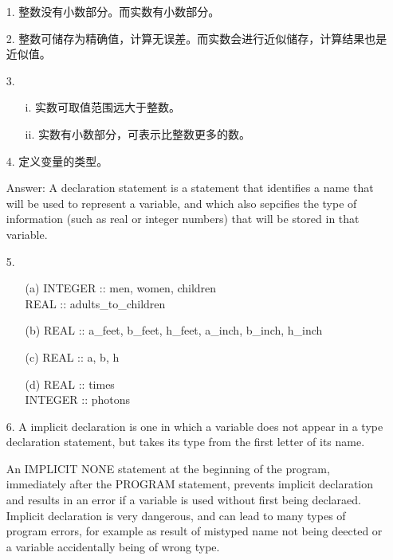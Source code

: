 \documentclass[a4paper,titlepage]{report}
\theoremstyle{definition}
\begin{document}
\begin{itemize}
  \item[1.]
  整数没有小数部分。而实数有小数部分。

  \item[2.]
  整数可储存为精确值，计算无误差。而实数会进行近似储存，计算结果也是近似值。

  \item[3.]
  \begin{itemize}
    \item[i.]
    实数可取值范围远大于整数。

    \item[ii.]
    实数有小数部分，可表示比整数更多的数。

  \end{itemize}

  \item[4.]
  定义变量的类型。 \par
  Answer: A declaration statement is a statement that identifies a name that will be used to represent a variable, and which also sepcifies the type of information (such as real or integer numbers) that will be stored in that variable.

  \item[5.]
  \begin{itemize}
    \item[(a)]
    INTEGER :: men, women, children \\
    REAL :: adults\_to\_children

    \item[(b)]
    REAL :: a\_feet, b\_feet, h\_feet, a\_inch, b\_inch, h\_inch

    \item[(c)]
    REAL :: a, b, h

    \item[(d)]
    REAL :: times \\
    INTEGER :: photons
  \end{itemize}

  \item[6.]
  A implicit declaration is one in which a variable does not appear in a type declaration statement, but takes its type from the first letter of its name. \par
  An IMPLICIT NONE statement at the beginning of the program, immediately after the PROGRAM statement, prevents implicit declaration and results in an error if a variable is used without first being declaraed. Implicit declaration is very dangerous, and can lead to many types of program errors, for example as result of mistyped name not being deected or a variable accidentally being of wrong type.


\end{itemize}
\end{document}
